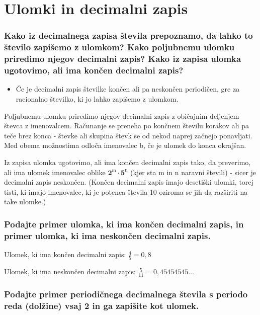 \documentclass{article}
\begin{document}
\section{Ulomki in decimalni zapis}
\subsubsection*{Kako iz decimalnega zapisa števila prepoznamo, da lahko to število zapišemo z ulomkom? Kako poljubnemu ulomku priredimo njegov decimalni zapis? Kako iz zapisa ulomka ugotovimo, ali ima končen decimalni zapis?}

\begin{itemize}
  \item Če je decimalni zapis številke končen ali pa neskončen periodičen, gre za racionalno številko, ki jo lahko zapišemo z ulomkom.
\end{itemize}

Poljubnemu ulomku priredimo njegov decimalni zapis z običajnim deljenjem števca z imenovalcem. Računanje se preneha po končnem številu korakov ali pa teče brez konca - števke ali skupina števk se od nekod naprej začnejo ponavljati. Med obema možnostima odloča imenovalec b, če je ulomek do konca okrajšan.

Iz zapisa ulomka ugotovimo, ali ima končen decimalni zapis tako, da preverimo, ali ima ulomek imenovalec oblike $\mathbf{2}^{\mathrm{m}} \cdot \mathbf{5}^{\mathrm{n}}$ (kjer sta $\mathrm{m}$ in $\mathrm{n}$ naravni števili) - sicer je decimalni zapis neskončen. (Končen decimalni zapis imajo desetiški ulomki, torej tisti, ki imajo imenovalec, ki je potenca števila 10 oziroma se jih da razširiti na take ulomke.)

\subsubsection*{Podajte primer ulomka, ki ima končen decimalni zapis, in primer ulomka, ki ima neskončen decimalni zapis.}

Ulomek, ki ima končen decimalni zapis: $\frac{4}{5}=0,8$

Ulomek, ki ima neskončen decimalni zapis: $\frac{5}{11}=0,45454545 \ldots$

\subsubsection*{Podajte primer periodičnega decimalnega števila s periodo reda (dolžine) vsaj 2 in ga zapišite kot ulomek.}
\end{document}
